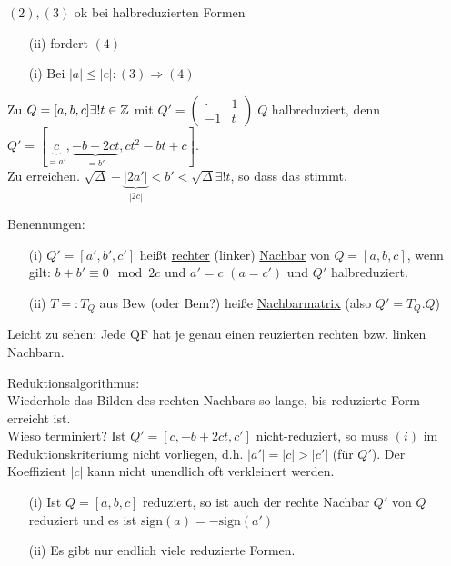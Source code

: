 \documentclass[a4paper,DIV15,BCOR12mm]{article}
\begin{document}
\begin{beweis}
$(2), (3)$ ok bei halbreduzierten Formen
\begin{itemize}
\item[(ii)] fordert $(4)$
\item[(i)] Bei $|a| \le |c|: (3) \Rightarrow (4)$
\end{itemize}
\end{beweis}

\begin{bemerkung}
Zu $Q = [a,b,c] \exists ! t \in \mathbb{Z}$ mit $Q' = \begin{pmatrix}\cdot & 1 \\ -1 & t\end{pmatrix}.Q$ halbreduziert, denn $Q' = [\underbrace{c}_{=a'}, \underbrace{-b+2ct}_{=b'}, ct^2 - bt + c]$.\\
Zu erreichen. $\sqrt{\Delta} - \underbrace{|2a'|}_{|2c|} < b' < \sqrt{\Delta} \exists ! t$, so dass das stimmt.
\end{bemerkung}

Benennungen:
\begin{itemize}
\item[(i)] $Q' = [a',b',c']$ heißt \underline{rechter} (linker) \underline{Nachbar} von $Q = [a,b,c]$, wenn gilt: $b + b' \equiv 0 \mod 2c$ und $a' = c$ $(a = c')$ und $Q'$ halbreduziert.
\item[(ii)] $T =: T_Q$ aus Bew (oder Bem?) heiße \underline{Nachbarmatrix} (also $Q' = T_Q.Q$)
\end{itemize}

Leicht zu sehen: Jede QF hat je genau einen reuzierten rechten bzw. linken Nachbarn.

Reduktionsalgorithmus:\\
Wiederhole das Bilden des rechten Nachbars so lange, bis reduzierte Form erreicht ist.\\
Wieso terminiert? Ist $Q' = [c, -b+2ct, c']$ nicht-reduziert, so muss $(i)$ im Reduktionskriteriumg nicht vorliegen, d.h. $|a'| = |c| > |c'|$ (für $Q'$). Der Koeffizient $|c|$ kann nicht unendlich oft verkleinert werden.

\begin{satz}[Nachbarreduktionssatz]
\begin{itemize}
\item[(i)] Ist $Q = [a,b,c]$ reduziert, so ist auch der rechte Nachbar $Q'$ von $Q$ reduziert und es ist $\text{sign}(a) = -\text{sign}(a')$
\item[(ii)] Es gibt nur endlich viele reduzierte Formen.
\end{itemize}
\end{satz}
\end{document}
